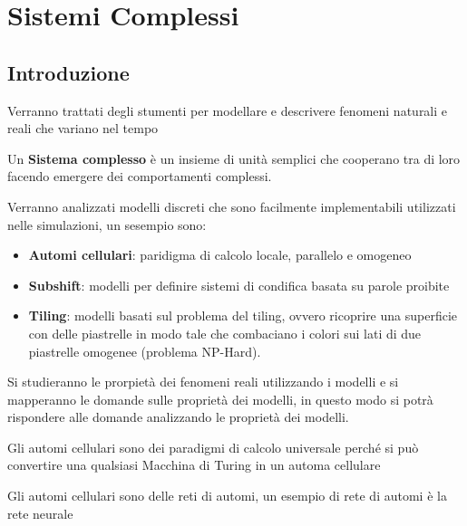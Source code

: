 \chapter{Sistemi Complessi}
\section{Introduzione}
Verranno trattati degli stumenti per modellare e descrivere fenomeni naturali e reali
che variano nel tempo
\begin{definizione}
    Un \textbf{Sistema complesso} è un insieme di unità semplici che cooperano tra
    di loro facendo emergere dei comportamenti complessi.
\end{definizione}
Verranno analizzati modelli discreti che sono facilmente implementabili utilizzati
nelle simulazioni, un sesempio sono:
\begin{itemize}
    \item \textbf{Automi cellulari}: paridigma di calcolo locale, parallelo e omogeneo
    \item \textbf{Subshift}: modelli per definire sistemi di condifica basata su
    parole proibite
    \item \textbf{Tiling}: modelli basati sul problema del tiling, ovvero ricoprire
    una superficie con delle piastrelle in modo tale che combaciano i colori sui
    lati di due piastrelle omogenee (problema NP-Hard).
\end{itemize}

Si studieranno le prorpietà dei fenomeni reali utilizzando i modelli e si mapperanno
le domande sulle proprietà dei modelli, in questo modo si potrà rispondere alle 
domande analizzando le proprietà dei modelli.

\begin{nota}
    Gli automi cellulari sono dei paradigmi di calcolo universale perché si 
    può convertire una qualsiasi Macchina di Turing in un automa cellulare
\end{nota}

\begin{nota}
    Gli automi cellulari sono delle reti di automi, un esempio di rete di automi
    è la rete neurale
\end{nota}